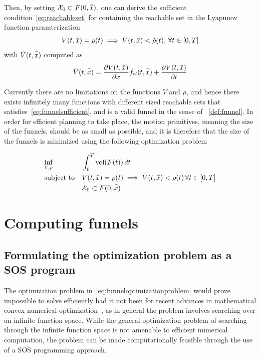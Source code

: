 Then, by setting \(\mathcal{X}_0 \subset F(0,\bar{\bar{x}})\), one can derive the
sufficient condition~\cref{eq:reachableset} for containing the reachable set in
the Lyapunov function paramterization
\begin{equation}
  \label{eq:funnelsufficient}
  V(t,\bar{\bar{x}}) = \rho(t) \implies \dot{V}(t,\bar{\bar{x}}) < \dot{\rho}(t), \, \forall t \in [0,T]
\end{equation}
with \(\dot{V}(t,\bar{\bar{x}})\) computed as
\begin{equation}
  \dot{V}(t,\bar{\bar{x}}) = \frac{\partial V(t,\bar{\bar{x}})}{\partial \bar{x}} f_{cl}(t,\bar{\bar{x}}) + \frac{\partial V(t,\bar{\bar{x}})}{\partial t}
\end{equation}

Currently there are no limitations on the functions \(V\) and \(\rho\), and
hence there exists infinitely many functions with different sized reachable sets
that satisfies~\cref{eq:funnelsufficient}, and is a valid funnel in the sense of
~\cref{def:funnel}. In order for efficient planning to take place, the motion
primitives, meaning the size of the funnels, should be as small as possible, and
it is therefore that the size of the funnels is minimized using the following
optimization problem~\cite{majumdarFunnelLibrariesRealtime2017}

\begin{align}
  \label{eq:funneloptimizationproblem}
  &\underset{V,\rho}{\text{inf}} \; &&\int_{0}^{T} \operatorname{vol}(F(t))\, dt \\
  &\text{subject to} && V(t,\bar{\bar{x}}) = \rho (t) \implies \dot{V}(t,\bar{\bar{x}}) < \rho (t) \, \forall t \in [0,T] \\
  && &\mathcal{X}_0 \subset F(0,\bar{\bar{x}}) \\
\end{align} 


\section{Computing funnels}

\subsection{Formulating the optimization problem as a SOS program}

The optimization problem in~\cref{eq:funneloptimizationproblem} would prove
impossible to solve efficiently had it not been for recent advances in
mathematical convex numerical
optimization~\cite[Parillo]{parilloStructuredSemidefinitePrograms}, as in
general the problem involves searching over an infinite function space. While
the general optimization problem of searching through the infinite function
space is not amenable to efficient numerical computation, the problem can be
made computationally feasible through the use of a \ac{SOS} programming
approach.

